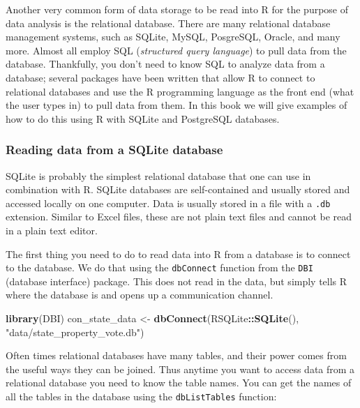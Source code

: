 \documentclass[
]{article}
\newenvironment{Shaded}{\begin{snugshade}}{\end{snugshade}}
\newcommand{\KeywordTok}[1]{\textcolor[rgb]{0.13,0.29,0.53}{\textbf{#1}}}
\newcommand{\NormalTok}[1]{#1}
\newcommand{\OperatorTok}[1]{\textcolor[rgb]{0.81,0.36,0.00}{\textbf{#1}}}
\newcommand{\StringTok}[1]{\textcolor[rgb]{0.31,0.60,0.02}{#1}}
\begin{document}
Another very common form of data storage to be read into R for the
purpose of data analysis is the relational database. There are many
relational database management systems, such as SQLite, MySQL,
PosgreSQL, Oracle, and many more. Almost all employ SQL
(\emph{structured query language}) to pull data from the database.
Thankfully, you don't need to know SQL to analyze data from a database;
several packages have been written that allow R to connect to relational
databases and use the R programming language as the front end (what the
user types in) to pull data from them. In this book we will give
examples of how to do this using R with SQLite and PostgreSQL databases.

\hypertarget{reading-data-from-a-sqlite-database}{%
\subsubsection{Reading data from a SQLite
database}\label{reading-data-from-a-sqlite-database}}

SQLite is probably the simplest relational database that one can use in
combination with R. SQLite databases are self-contained and usually
stored and accessed locally on one computer. Data is usually stored in a
file with a \texttt{.db} extension. Similar to Excel files, these are
not plain text files and cannot be read in a plain text editor.

The first thing you need to do to read data into R from a database is to
connect to the database. We do that using the \texttt{dbConnect}
function from the \texttt{DBI} (database interface) package. This does
not read in the data, but simply tells R where the database is and opens
up a communication channel.

\begin{Shaded}
\begin{Highlighting}[]
\KeywordTok{library}\NormalTok{(DBI)}
\NormalTok{con\_state\_data <{-}}\StringTok{ }\KeywordTok{dbConnect}\NormalTok{(RSQLite}\OperatorTok{::}\KeywordTok{SQLite}\NormalTok{(), }\StringTok{"data/state\_property\_vote.db"}\NormalTok{)}
\end{Highlighting}
\end{Shaded}

Often times relational databases have many tables, and their power comes
from the useful ways they can be joined. Thus anytime you want to access
data from a relational database you need to know the table names. You
can get the names of all the tables in the database using the
\texttt{dbListTables} function:
\end{document}
